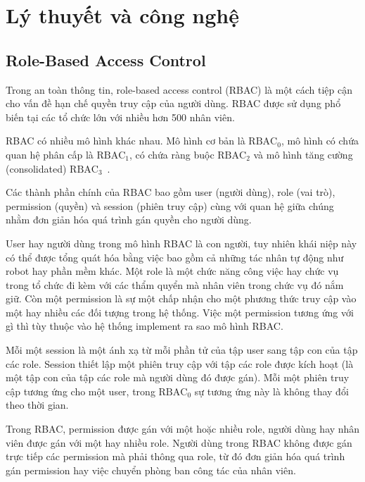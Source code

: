\section{Lý thuyết và công nghệ}
\subsection{Role-Based Access Control}
Trong an toàn thông tin, role-based access control (RBAC) là
một cách tiệp cận cho vấn đề hạn chế quyền truy cập của
người dùng. RBAC được sử dụng phổ biến tại các tổ chức
lớn với nhiều hơn 500 nhân viên. 

RBAC có nhiều mô hình khác nhau. Mô hình cơ bản là
$\text{RBAC}_0$, mô hình có chứa quan hệ phân cấp là
$\text{RBAC}_1$, có chứa ràng buộc $\text{RBAC}_2$ và mô hình tăng
cường (consolidated) $\text{RBAC}_3$~\cite{rbac}.

Các thành phần chính của RBAC bao gồm user (người dùng),
role (vai trò), permission (quyền) và session (phiên truy cập)
cùng với quan hệ giữa chúng nhằm đơn giản hóa quá trình
gán quyền cho người dùng. 

User hay người dùng trong mô hình RBAC là con người, tuy nhiên
khái niệp này có thể được tổng quát hóa bằng việc bao gồm cả những
tác nhân tự động như robot hay phần mềm khác. Một role là một
chức năng công việc hay chức vụ trong tổ chức đi kèm với các
thẩm quyển mà nhân viên trong chức vụ đó nắm giữ. Còn một
permission là sự một chấp nhận cho một phương thức truy cập
vào một hay nhiều các đối tượng trong hệ thống. Việc một
permission tương ứng với gì thì tùy thuộc vào hệ thống
implement ra sao mô hình RBAC.

Mỗi một session là một ánh xạ từ mỗi phần tử của tập user
sang tập con của tập các role. Session thiết lập một phiên
truy cập với tập các role được kích hoạt (là một tập con
của tập các role mà người dùng đó được gán). Mỗi một phiên truy
cập tương ứng cho một user, trong $\text{RBAC}_0$ sự tương ứng này
là không thay đổi theo thời gian.

Trong RBAC, permission được gán với một hoặc nhiều role,
người dùng hay nhân viên được gán với một hay nhiều role.
Người dùng trong RBAC không được gán trực tiếp các permission mà
phải thông qua role, từ đó đơn giản hóa quá trình gán
permission hay việc chuyển phòng ban công tác của nhân viên. 

